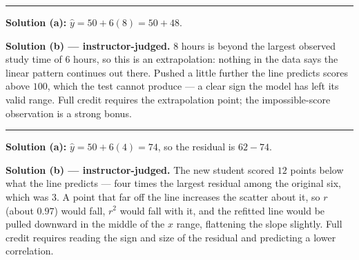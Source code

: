\documentclass[12pt]{article}
\begin{document}
\vspace{0.15cm}\noindent\rule{\linewidth}{0.2pt}\vspace{0.15cm}


\textbf{Solution (a):} \quad $\hat{y} = 50 + 6(8) = 50 + 48$. 

\textbf{Solution (b) --- instructor-judged.} \quad $8$ hours is beyond the largest observed
study time of $6$ hours, so this is an extrapolation: nothing in the data says the linear
pattern continues out there. Pushed a little further the line predicts scores above $100$,
which the test cannot produce --- a clear sign the model has left its valid range. Full credit
requires the extrapolation point; the impossible-score observation is a strong bonus.

\vspace{0.15cm}\noindent\rule{\linewidth}{0.2pt}\vspace{0.15cm}


\textbf{Solution (a):} \quad $\hat{y} = 50 + 6(4) = 74$, so the residual is
$62 - 74$. 

\textbf{Solution (b) --- instructor-judged.} \quad The new student scored $12$ points below
what the line predicts --- four times the largest residual among the original six, which was
$3$. A point that far off the line increases the scatter about it, so $r$ (about $0.97$) would
fall, $r^2$ would fall with it, and the refitted line would be pulled downward in the middle of
the $x$ range, flattening the slope slightly. Full credit requires reading the sign and size of
the residual and predicting a lower correlation.
\end{document}
